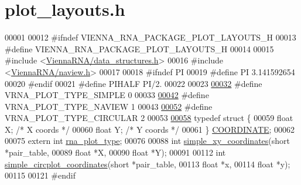 \hypertarget{plot__layouts_8h_source}{}\section{plot\+\_\+layouts.\+h}
\label{plot__layouts_8h_source}

\begin{DoxyCode}
00001 
00012 \textcolor{preprocessor}{#ifndef VIENNA\_RNA\_PACKAGE\_PLOT\_LAYOUTS\_H}
00013 \textcolor{preprocessor}{#define VIENNA\_RNA\_PACKAGE\_PLOT\_LAYOUTS\_H}
00014 
00015 \textcolor{preprocessor}{#include <\hyperlink{data__structures_8h}{ViennaRNA/data\_structures.h}>}
00016 \textcolor{preprocessor}{#include <\hyperlink{naview_8h}{ViennaRNA/naview.h}>}
00017 
00018 \textcolor{preprocessor}{#ifndef PI}
00019 \textcolor{preprocessor}{#define  PI       3.141592654}
00020 \textcolor{preprocessor}{#endif}
00021 \textcolor{preprocessor}{#define  PIHALF       PI/2.}
00022 
00023 
\hypertarget{plot__layouts_8h_source.tex_l00032}{}\hyperlink{group__plotting__utils_gae6d17b9f0a53cf5205a9181e0f8422e9}{00032} \textcolor{preprocessor}{#define VRNA\_PLOT\_TYPE\_SIMPLE     0}
00033 
\hypertarget{plot__layouts_8h_source.tex_l00042}{}\hyperlink{group__plotting__utils_ga94d4c863ecac2f220f76658afb92f964}{00042} \textcolor{preprocessor}{#define VRNA\_PLOT\_TYPE\_NAVIEW     1}
00043 
\hypertarget{plot__layouts_8h_source.tex_l00052}{}\hyperlink{group__plotting__utils_ga8c9eac631348da92136c8363ecdd9fb9}{00052} \textcolor{preprocessor}{#define VRNA\_PLOT\_TYPE\_CIRCULAR   2}
00053 
\hypertarget{plot__layouts_8h_source.tex_l00058}{}\hyperlink{structCOORDINATE}{00058} \textcolor{keyword}{typedef} \textcolor{keyword}{struct }\{
00059   \textcolor{keywordtype}{float} X; \textcolor{comment}{/* X coords */}
00060   \textcolor{keywordtype}{float} Y; \textcolor{comment}{/* Y coords */}
00061 \} \hyperlink{structCOORDINATE}{COORDINATE};
00062 
00075 \textcolor{keyword}{extern} \textcolor{keywordtype}{int} \hyperlink{group__plotting__utils_ga5964c4581431b098b80027d6e14dcdd4}{rna\_plot\_type};
00076 
00088 \textcolor{keywordtype}{int} \hyperlink{group__plotting__utils_gaf4b9173e7d3fd361c3c85e6def194123}{simple\_xy\_coordinates}(\textcolor{keywordtype}{short} *pair\_table,
00089                           \textcolor{keywordtype}{float} *X,
00090                           \textcolor{keywordtype}{float} *Y);
00091 
00112 \textcolor{keywordtype}{int} \hyperlink{group__plotting__utils_gac4ea13d35308f09940178d2b05a248c2}{simple\_circplot\_coordinates}(\textcolor{keywordtype}{short} *pair\_table,
00113                                 \textcolor{keywordtype}{float} *x,
00114                                 \textcolor{keywordtype}{float} *y);
00115 
00121 \textcolor{preprocessor}{#endif}
\end{DoxyCode}

